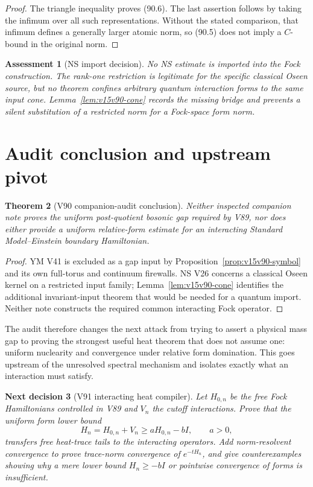 \documentclass[11pt]{article}
\newtheorem{theorem}{Theorem}[section]
\newtheorem{decision}[theorem]{Next decision}
\newtheorem{assessment}[theorem]{Assessment}
\theoremstyle{remark}
\begin{document}
\begin{proof}
The triangle inequality proves (90.6).  The last assertion follows
by taking the infimum over all such representations.  Without the
stated comparison, that infimum defines a generally larger atomic
norm, so (90.5) does not imply a \(C\)-bound in the original norm.
\end{proof}

\begin{assessment}[NS import decision]
\label{ass:v15v90-ns}
No NS estimate is imported into the Fock construction.  The
rank-one restriction is legitimate for the specific classical
Oseen source, but no theorem confines arbitrary quantum interaction
forms to the same input cone.  Lemma~\ref{lem:v15v90-cone} records
the missing bridge and prevents a silent substitution of a
restricted norm for a Fock-space form norm.
\end{assessment}

\section{Audit conclusion and upstream pivot}

\begin{theorem}[V90 companion-audit conclusion]
\label{thm:v15v90-audit}
Neither inspected companion note proves the uniform post-quotient
bosonic gap required by V89, nor does either provide a uniform
relative-form estimate for an interacting Standard Model--Einstein
boundary Hamiltonian.
\end{theorem}

\begin{proof}
YM V41 is excluded as a gap input by
Proposition~\ref{prop:v15v90-symbol} and its own full-torus and
continuum firewalls.  NS V26 concerns a classical Oseen kernel on a
restricted input family; Lemma~\ref{lem:v15v90-cone} identifies the
additional invariant-input theorem that would be needed for a
quantum import.  Neither note constructs the required common
interacting Fock operator.
\end{proof}

The audit therefore changes the next attack from trying to assert a
physical mass gap to proving the strongest useful heat theorem that
does not assume one: uniform nuclearity and convergence under
relative form domination.  This goes upstream of the unresolved
spectral mechanism and isolates exactly what an interaction must
satisfy.

\begin{decision}[V91 interacting heat compiler]
\label{dec:v15v90-next}
Let \(H_{0,n}\) be the free Fock Hamiltonians controlled in V89 and
\(V_n\) the cutoff interactions.  Prove that the uniform form lower
bound
\[
 H_n=H_{0,n}+V_n\geq aH_{0,n}-bI,\qquad a>0,           \tag{90.7}
\]
transfers free heat-trace tails to the interacting operators.  Add
norm-resolvent convergence to prove trace-norm convergence of
\(e^{-tH_n}\), and give counterexamples showing why a mere lower
bound \(H_n\geq-bI\) or pointwise convergence of forms is
insufficient.
\end{decision}
\end{document}
